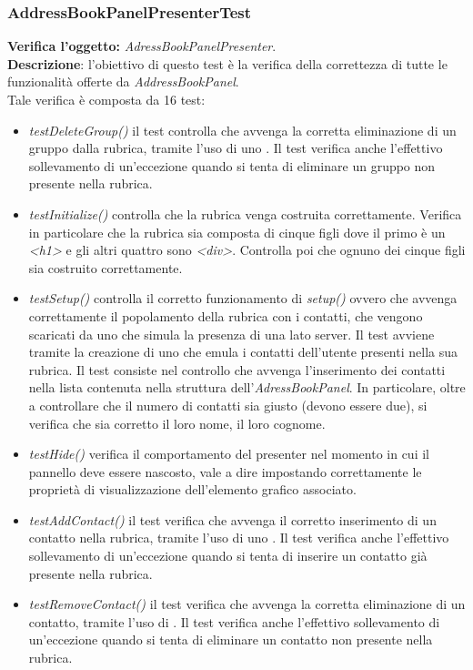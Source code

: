 \subsubsection{AddressBookPanelPresenterTest}
\textbf{Verifica l'oggetto:} \textit{AdressBookPanelPresenter}.\\
\textbf{Descrizione}: l'obiettivo di questo test è la verifica della correttezza di tutte le funzionalità offerte da \textit{AddressBookPanel}.\\
Tale verifica è composta da 16 test:
\begin{itemize}
\item \textit{testDeleteGroup() } il test controlla che avvenga la corretta eliminazione di un gruppo dalla rubrica, tramite l'uso di uno . Il test verifica anche l'effettivo sollevamento di un'eccezione quando si tenta di eliminare un gruppo non presente nella rubrica.
\item \textit{testInitialize()} controlla che la rubrica venga costruita correttamente. Verifica in particolare che la rubrica sia composta di cinque figli dove il primo è un \textit{<h1>} e gli altri quattro sono \textit{<div>}. Controlla poi che ognuno dei cinque figli sia costruito correttamente. 
\item \textit{testSetup()} controlla il corretto funzionamento di \textit{setup()} ovvero che avvenga correttamente il popolamento della rubrica con i contatti, che vengono scaricati da uno  che simula la presenza di una  lato server. 
Il test avviene tramite la creazione di uno  che emula i contatti dell'utente presenti nella sua rubrica. 
Il test consiste nel controllo che avvenga l'inserimento dei contatti nella lista contenuta nella struttura dell'\textit{AdressBookPanel}. In particolare, oltre a controllare che il numero di contatti sia giusto (devono essere due), si verifica che sia corretto il loro nome, il loro cognome.
\item \textit{testHide()} verifica il comportamento del presenter nel momento in cui il pannello deve essere nascosto, vale a dire impostando correttamente le proprietà di visualizzazione dell'elemento grafico associato.
\item \textit{testAddContact() } il test verifica che avvenga il corretto inserimento di un contatto nella rubrica, tramite l'uso di uno . Il test verifica anche l'effettivo sollevamento di un'eccezione quando si tenta di inserire un contatto già presente nella rubrica.
\item \textit{testRemoveContact()} il test verifica che avvenga la corretta eliminazione di un contatto, tramite l'uso di . Il test verifica anche l'effettivo sollevamento di un'eccezione quando si tenta di eliminare un contatto non presente nella rubrica.

\end{itemize}
